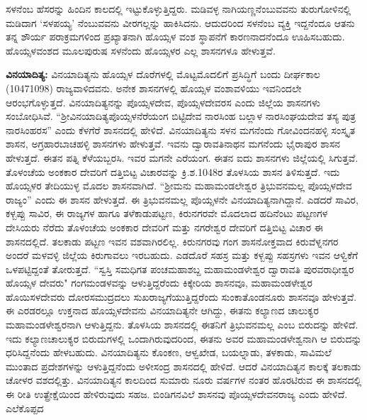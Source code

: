 ಸಳನೆಂಬ ಹೆಸರನ್ನು ಹಿಂದಿನ ಕಾಲದಲ್ಲಿ ಇಟ್ಟುಕೊಳ್ಳುತ್ತಿದ್ದರು. ಮಡಿವಳ್ಳ ನಾಗಿಯಣ್ಣನೆಂಬುವವನು ತುರುಗೋಳಿನಲ್ಲಿ ಮಡಿದಾಗ ‘ಸಳಪಯ್ಯ’ ನೆಂಬುವವನು ವೀರಗಲ್ಲನ್ನು ಹಾಕಿಸಿದನು. ಆದುದರಿಂದ ಸಳನೆಂಬ ವ್ಯಕ್ತಿ ಇದ್ದನೆಂದೂ ಆತನು ತನ್ನ ಶೌರ್ಯ ಪರಾಕ್ರಮಗಳಿಂದ ಪ್ರಖ್ಯಾತನಾಗಿ ಹೊಯ್ಸಳ ವಂಶ ಸ್ಥಾಪನೆಗೆ ಕಾರಣನಾದನೆಂದೂ ಊಹಿಸಬಹುದು. ಹೊಯ್ಸಳವಂಶದ ಮೂಲಪುರುಷ ಸಳನೆಂದು ಹೊಯ್ಸಳರ ಎಲ್ಲ ಶಾಸನಗಳೂ ಹೇಳುತ್ತವೆ.

\textbf{ವಿನಯಾದಿತ್ಯ:} ವಿನಯಾದಿತ್ಯನು ಹೊಯ್ಸಳ ದೊರೆಗಳಲ್ಲಿ ಮೊಟ್ಟಮೊದಲಿಗೆ ಪ್ರಸಿದ್ಧಿಗೆ ಬಂದು ದೀರ್ಘಕಾಲ (1047\enginline{-}1098) ರಾಜ್ಯವಾಳಿದವನು. ಅನೇಕ ಶಾಸನಗಳಲ್ಲಿ ಹೊಯ್ಸಳ ವಂಶಾವಳಿಯು ಇವನಿಂದಲೇ ಆರಂಭಗೊಳ್ಳುತ್ತದೆ. ವಿನಯಾದಿತ್ಯನನ್ನು ಪೊಯ್ಸಳದೇವ, ಪೊಯ್ಸಳದೇವರಸ ಎಂದು ಜಿಲ್ಲೆಯ ಶಾಸನಗಳು ಸಂಬೋಧಿಸಿವೆ. “ಶ‍್ರೀವಿನಯಾದಿತ್ಯ\-ಪೊಯ್ಸಳನೆರೆಯಂಗ ಬಿಟ್ಟಿದೇವ ನಾರಸಿಂಹ ಬಲ್ಲಾಳ ನಾರಸಿಂಘಯದೇವ ತಸ್ಯ ಪುತ್ರ ನಾರಸಿಂಹರಸ” ಎಂದು ಕೆಳಗೆರೆ ಶಾಸನದಲ್ಲಿ ಹೇಳಿದೆ. ವಿನಯಾದಿತ್ಯನು ಸಳನ ಮಗನೆಂದು ಗೋವಿಂದನಹಳ್ಳಿ ಸಂಸ್ಕೃತ ಶಾಸನ, ಅಗ್ರಹಾರಬಾಚಹಳ್ಳಿ ಶಾಸನಗಳು ಹೇಳುತ್ತವೆ. ಇವನು ದ್ವಾರಾವತಿನಾಥನ ಮಗನೆಂದು ಭೈರಾಪುರ ಶಾಸನ ಹೇಳುತ್ತದೆ. ಈತನ ಪತ್ನಿ ಕೆಳೆಯಬ್ಬರಸಿ. ಇವರ ಮಗನೇ ಎರೆಯಂಗ. ಈತನ ಐದು ಶಾಸನಗಳು ಜಿಲ್ಲೆಯಲ್ಲಿ ಸಿಗುತ್ತವೆ. ತೊಳಂಚೆಯ ಅಂಕಕಾರ ದೇವರಿಗೆ ದತ್ತಿಬಿಟ್ಟ ವಿಚಾರವನ್ನು ಕ್ರಿ.ಶ.1048ರ ತೊಳಸಿಯ ಶಾಸನ ತಿಳಿಸುತ್ತದೆ. ಇದು ಹೊಯ್ಸಳರ ತೇದಿಯುಳ್ಳ ಮೊದಲ ಶಾಸನವಾಗಿದೆ. “ಶ‍್ರೀಮನು ಮಹಾಮಂಡಲೇಶ್ವರ ತ್ರಿಭುವನಮಲ್ಲ ಪೊಯ್ಸಳದೇವ ರಾಜ್ಯಂ” ಎಂದು ಈ ಶಾಸನ ಹೇಳುತ್ತದೆ. ಈ ತ್ರಿಭುವನಮಲ್ಲ ಪೊಯ್ಸಳನೇ ವಿನಯಾದಿತ್ಯನಾಗಿದ್ದಾನೆ. ಎಡದರೆ ಸಾವಿರ, ಕಳ್ಬಪ್ಪು ಸಾವಿರ, ಈ ರಾಜ್ಯಗಳ ಹಾಗೂ ತಳೆಕಾಡುಪಟ್ಟಣ, ಕಿರುನಗರವೇ ಮೊದಲಾದ ಹದಿನೆಂಟು ಪಟ್ಟಣಗಳ ದೇಸಿಯರು ನೆರೆದು ತೊಳಂಚೆಯ ಅಂಕಕಾರ ದೇವರಿಗೆ ಮತ್ತು ನಗರೇಶ್ವರ ದೇವರಿಗೆ ದತ್ತಿಬಿಟ್ಟ ವಿಚಾರ ಈ ಶಾಸನದಲ್ಲಿದೆ. ತಲಕಾಡು ಪಟ್ಟಣ ಇವನ ವಶವಾಗಿರಲಿಲ್ಲ. ಕಿರುನಗರವು ಗಂಗ ಶಾಸನೋಕ್ತವಾದ ಕಿರುವೆಳ್ನನಗರ ಅಂದರೆ ಮಳವಳ್ಳಿ ಜಿಲ್ಲೆಯ ಕಿರುಗಾವಲು ಇರಬಹುದು. ಎಡದೊರೆ ಸಹಸ್ರ ಮತ್ತು ಕಳ್ಬಪ್ಪು ಸಹಸ್ರಗಳು ಇವನ ಆಳ್ವಿಕೆಗೆ ಒಳಪಟ್ಟಿದ್ದಂತೆ ತೋರುತ್ತದೆ. “ಸ್ವಸ್ತಿ ಸಮಧಿಗತ ಪಂಚಮಹಾಶಬ್ದ ಮಹಾಮಂಡಳೇಶ್ವರ ದ್ವಾರಾವತಿ ಪುರವರಾಧೀಶ್ವರ ಹೊಯ್ಸಳ ದೇವರು" ಗಂಗಮಂಡಳವನ್ನು ಆಳುತ್ತಿದ್ದರೆಂದು ಕಿಕ್ಕೇರಿಯ ಶಾಸನವೂ, ಮಹಾಮಂಡಳೇಶ್ವರ ಹೊಯಿಸಳದೇವರು ದೋರಸಮುದ್ರದಲು ಸುಖರಾಜ್ಯಗೆಯುತ್ತಿದ್ದರೆಂದು ಸುಂಕಾತೊಂಡನೂರು ಶಾಸನವೂ ಹೇಳುತ್ತವೆ. ಈ ಎರಡರಲ್ಲೂ ಉಕ್ತನಾದ ಹೊಯ್ಸಳದೇವನು ವಿನಯಾದಿತ್ಯನೇ ಆಗಿದ್ದು, ಈತನು ಕಲ್ಯಾಣದ ಚಾಲುಕ್ಯರ ಮಹಾಮಂಡಳೇಶ್ವರ\-ನಾಗಿ ಆಳುತ್ತಿದ್ದನು. ತೊಳಸಿಯ ಶಾಸನದಲ್ಲಿ ಈತನಿಗೆ ತ್ರಿಭುವನಮಲ್ಲ ಎಂಬ ಬಿರುದನ್ನು ಹೇಳಿದೆ. ಇದು ಕಲ್ಯಾಣಚಾಲುಕ್ಯರ ಬಿರುದುಗಳಲ್ಲಿ ಒಂದಾಗಿರುವುದರಿಂದ, ಈತನು ಅವರ ಮಹಾಮಂಡಳೇಶ್ವನಾಗಿ ಆ ಬಿರುದನ್ನು ಧರಿಸಿದ್ದನೆಂದು ಹೇಳಬಹುದು. ವಿನಯಾದಿತ್ಯನು ಕೊಂಕಣ, ಆಳ್ವಖೇಡ, ಬಯಲ್ನಾಡು, ತಳಕಾಡು, ಸಾವಿಮಲೆ ಮುಂತಾದ ಪ್ರದೇಶಗಳನ್ನು ಆಳುತ್ತಿದ್ದನೆಂದು ಅಳೀಸಂದ್ರ ಶಾಸನದಲ್ಲಿ ಹೇಳಿದೆ. ಆದರೆ ವಿನಯಾದಿತ್ಯನ ಕಾಲಕ್ಕೆ ತಲಕಾಡು ಚೋಳರ ವಶದಲ್ಲಿತ್ತು. ವಿನಯಾದಿತ್ಯನ ಕಾಲದಿಂದ ಸುಮಾರು ನೂರು ವರ್ಷಗಳ ನಂತರ ಹೊರಟಿರುವ ಈ ಶಾಸನದಲ್ಲಿ ಈ ರೀತಿ ಉತ್ಪ್ರೇಕ್ಷೆಯಿಂದ ಹೇಳಿರುವುದು ಸಹಜ. ಬಿಂಡಿಗನವಿಲೆ ಶಾಸನವು ಪೊಯ್ಸಳದೇವನರಾಜ್ಯ ಎಂದು ಹೇಳಿದೆ. ಎಲೆಕೊಪ್ಪದ 